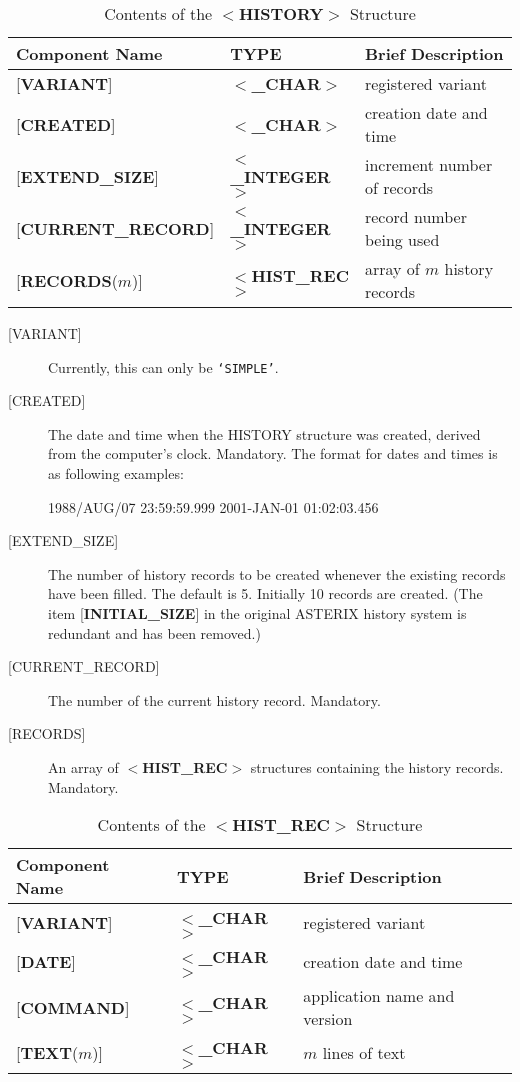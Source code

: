 \documentclass[twoside,11pt,nolof,noabs]{starlink}
\begin{document}
\begin{table}
\centering
\caption{Contents of the $<$\textbf{HISTORY}$>$ Structure}
\label{ta:history}
\begin{tabular}{|l|l|l|}
\hline
Component Name & TYPE & Brief Description \\ \hline
{[}\textbf{VARIANT}{]} & $<$\textbf{\_CHAR}$>$ & registered variant \\
{[}\textbf{CREATED}{]} & $<$\textbf{\_CHAR}$>$ & creation date and time \\
{[}\textbf{EXTEND\_SIZE}{]} & $<$\textbf{\_INTEGER}$>$ & increment number of records \\
{[}\textbf{CURRENT\_RECORD}{]} & $<$\textbf{\_INTEGER}$>$ & record number being used \\
{[}\textbf{RECORDS}($m$){]} & $<$\textbf{HIST\_REC}$>$ & array of $m$ history records \\ \hline
\end{tabular}
\end{table}

\begin{description}
\item [{[}VARIANT{]}]
Currently, this can only be \texttt{`SIMPLE'}.
\item [{[}CREATED{]}]
The date and time when the HISTORY structure was created,
derived from the computer's clock.  Mandatory.  The format for
dates and times is as following examples:
\begin{terminalv}
    1988/AUG/07 23:59:59.999
    2001-JAN-01 01:02:03.456
\end{terminalv}
\item [{[}EXTEND\_SIZE{]}]
The number of history records to be created whenever the existing
records have been filled.  The default is 5.
Initially 10 records are created.  (The item
{[}\textbf{INITIAL\_SIZE}{]}
in the original ASTERIX history system is redundant and has been
removed.)
\item [{[}CURRENT\_RECORD{]}]
The number of the current history record.  Mandatory.
\item [{[}RECORDS{]}]  An array of $<$\textbf{HIST\_REC}$>$
structures containing the
history records.  Mandatory.
\end{description}

\begin{table}
\centering
\caption{Contents of the $<$\textbf{HIST\_REC}$>$ Structure}
\begin{tabular}{|l|l|l|}
\hline
Component Name & TYPE & Brief Description \\ \hline
{[}\textbf{VARIANT}{]} & $<$\textbf{\_CHAR}$>$ & registered variant \\
{[}\textbf{DATE}{]} & $<$\textbf{\_CHAR}$>$ & creation date and time \\
{[}\textbf{COMMAND}{]} & $<$\textbf{\_CHAR}$>$ & application name
      and version \\
{[}\textbf{TEXT}($m$){]} & $<$\textbf{\_CHAR}$>$ &
      $m$ lines of text \\ \hline
\end{tabular}
\end{table}
\end{document}
